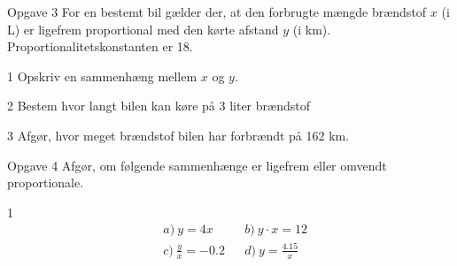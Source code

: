 \newpage
\begin{opgavetekst}{Opgave 3}
	For en bestemt bil gælder der, at den forbrugte mængde brændstof $x$ (i L) er ligefrem proportional med den kørte afstand $y$ (i km). Proportionalitetskonstanten er 18.
\end{opgavetekst}
\begin{delopgave}{}{1}
	Opskriv en sammenhæng mellem $x$ og $y$. 
\end{delopgave}
\begin{delopgave}{}{2}
	Bestem hvor langt bilen kan køre på 3 liter brændstof
\end{delopgave}
\begin{delopgave}{}{3}
	Afgør, hvor meget brændstof bilen har forbrændt på 162 km. 
\end{delopgave}
\newpage
\begin{opgavetekst}{Opgave 4}
	Afgør, om følgende sammenhænge er ligefrem eller omvendt proportionale.
\end{opgavetekst}
\begin{delopgave}{}{1}
	\begin{align*}
		&a) \ y = 4x   &    &b) \  y\cdot x = 12   \\
		&c) \ \frac{y}{x} = -0.2  &    &d) \ y = \frac{4.15}{x}    \\
	\end{align*}
\end{delopgave}
